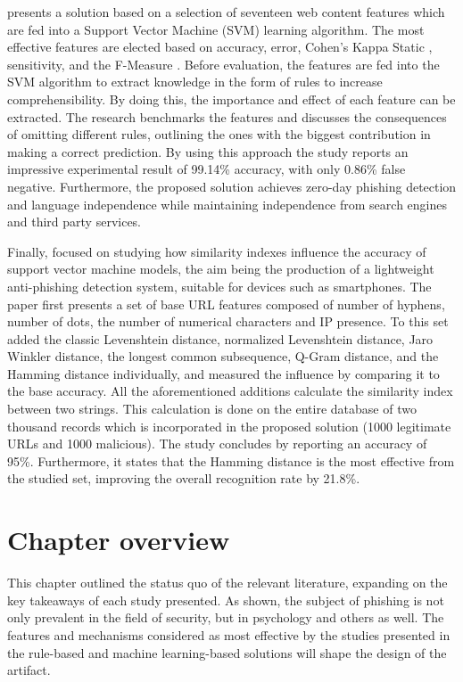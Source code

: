 \cite{SVM_ANTI_PHISHING} presents a solution based on a selection of seventeen web content features which are fed into a Support Vector Machine (SVM) learning algorithm. The most effective features are elected based on accuracy, error, Cohen's Kappa Static \citep{DATA_MINING_T&T}, sensitivity, and the F-Measure \citep{DATA_MINING_T&T}. Before evaluation, the features are fed into the SVM algorithm to extract knowledge in the form of rules to increase comprehensibility. By doing this, the importance and effect of each feature can be extracted. The research benchmarks the features and discusses the consequences of omitting different rules, outlining the ones with the biggest contribution in making a correct prediction.
By using this approach the study reports an impressive experimental result of 99.14\% accuracy, with only 0.86\% false negative. Furthermore, the proposed solution achieves zero-day phishing detection and language independence while maintaining independence from search engines and third party services.

Finally, \cite{SVM_SIMILARITY_INDEX} focused on studying how similarity indexes influence the accuracy of support vector machine models, the aim being the production of a lightweight anti-phishing detection system, suitable for devices such as smartphones. The paper first presents a set of base URL features composed of number of hyphens, number of dots, the number of numerical characters and IP presence. To this set \cite{SVM_SIMILARITY_INDEX} added the classic Levenshtein distance, normalized Levenshtein distance, Jaro Winkler distance, the longest common subsequence, Q-Gram distance, and the Hamming distance individually, and measured the influence by comparing it to the base accuracy. All the aforementioned additions calculate the similarity index between two strings. This calculation is done on the entire database of two thousand records which is incorporated in the proposed solution (1000 legitimate URLs and 1000 malicious). The study concludes by reporting an accuracy of 95\%. Furthermore, it states that the Hamming distance is the most effective from the studied set, improving the overall recognition rate by 21.8\%.

\section{Chapter overview}
This chapter outlined the status quo of the relevant literature, expanding on the key takeaways of each study presented. As shown, the subject of phishing is not only prevalent in the field of security, but in psychology and others as well. The features and mechanisms considered as most effective by the studies presented in the rule-based and machine learning-based solutions will shape the design of the artifact.

